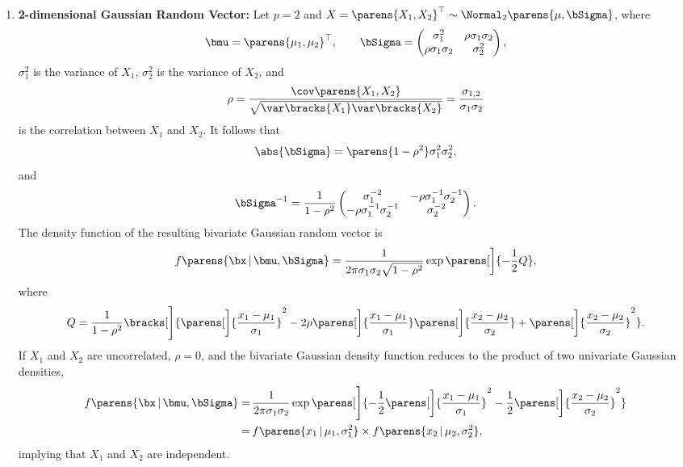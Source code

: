 \documentclass[12pt]{article}
\begin{document}
\begin{enumerate}[label=\textbf{\arabic*.}]
	\item \textbf{2-dimensional Gaussian Random Vector:} Let $p=2$ and $X = \parens{X_1, X_2}^\top \sim \Normal_2 \parens{\mu, \bSigma}$, where 
	\begin{align*}
		\bmu = \parens{\mu_1, \mu_2}^\top, \qquad \bSigma = \begin{pmatrix}
			\sigma_1^2 & \rho \sigma_1 \sigma_2 \\ 
			\rho \sigma_1 \sigma_2 & \sigma_2^2
		\end{pmatrix}, 
	\end{align*}
	$\sigma_1^2$ is the variance of $X_1$, $\sigma_2^2$ is the variance of $X_2$, and 
	\begin{align*}
		\rho = \frac{\cov \parens{X_1, X_2}}{\sqrt{\var \bracks{X_1} \var \bracks{X_2}}} = \frac{\sigma_{1,2}}{\sigma_1 \sigma_2}
	\end{align*}
	is the correlation between $X_1$ and $X_2$. It follows that 
	\begin{align*}
		\abs{\bSigma} = \parens{1 - \rho^2} \sigma_1^2 \sigma_2^2, 
	\end{align*}
	and 
	\begin{align*}
		\bSigma^{-1} = \frac{1}{1-\rho^2} \begin{pmatrix}
			\sigma_1^{-2} & - \rho \sigma_1^{-1} \sigma_2^{-1} \\ 
			- \rho \sigma_1^{-1} \sigma_2^{-1} & \sigma_2^{-2}
		\end{pmatrix}. 
	\end{align*}
	The density function of the resulting bivariate Gaussian random vector is 
	\begin{align*}
		f \parens{\bx \,\vert\, \bmu, \bSigma} = \frac{1}{2 \pi \sigma_1 \sigma_2 \sqrt{1 - \rho^2}} \exp \parens[\bigg]{-\frac{1}{2} Q}, 
	\end{align*}
	where 
	\begin{align*}
		Q = \frac{1}{1-\rho^2} \bracks[\Bigg]{\parens[\bigg]{\frac{x_1 - \mu_1}{\sigma_1}}^2 - 2 \rho \parens[\bigg]{\frac{x_1 - \mu_1}{\sigma_1}} \parens[\bigg]{\frac{x_2 - \mu_2}{\sigma_2}} + \parens[\bigg]{\frac{x_2 - \mu_2}{\sigma_2}}^2}. 
	\end{align*}
	If $X_1$ and $X_2$ are uncorrelated, $\rho = 0$, and the bivariate Gaussian density function reduces to the product of two univariate Gaussian densities, 
	\begin{align*}
		f \parens{\bx \,\vert\, \bmu, \bSigma} = & \, \frac{1}{2 \pi \sigma_1 \sigma_2} \exp \parens[\Bigg]{-\frac{1}{2} \parens[\bigg]{\frac{x_1 - \mu_1}{\sigma_1}}^2 - \frac{1}{2} \parens[\bigg]{\frac{x_2 - \mu_2}{\sigma_2}}^2} \\ 
		= & \, f \parens{x_1 \,\vert\, \mu_1, \sigma_1^2} \times f \parens{x_2 \,\vert\, \mu_2, \sigma_2^2}, 
	\end{align*}
	implying that $X_1$ and $X_2$ are independent. 
	

\end{enumerate}
\end{document}
